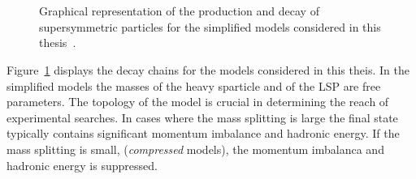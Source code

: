 \begin{figure}[h!]
  \begin{center}
     ~~
     \\
     ~~
    \caption{
      Graphical representation of the production and decay of supersymmetric particles 
      for the simplified models considered in this thesis~\cite{SMS}.
    }
    \label{fig:simplified-models-feyn}
  \end{center}
\end{figure}

Figure~\ref{fig:simplified-models-feyn} displays the decay chains for the models considered in this theis. 
In the simplified models the masses of the heavy sparticle and of the LSP are free parameters.
The topology of the model is crucial in determining the reach of experimental searches. 
In cases where the mass splitting is large the final state typically contains significant
momentum imbalance and hadronic energy. If the mass splitting is small, (\emph{compressed} models),
the momentum imbalanca and hadronic energy is suppressed. 

